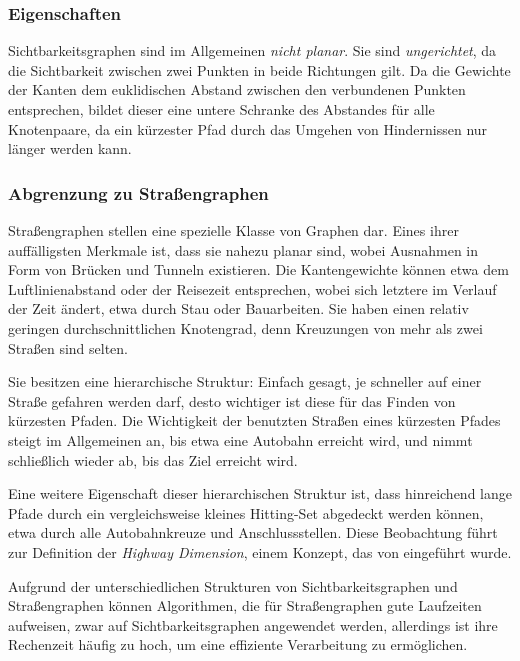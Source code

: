 \subsubsection{Eigenschaften}

Sichtbarkeitsgraphen sind im Allgemeinen \emph{nicht planar}.
Sie sind \emph{ungerichtet}, da die Sichtbarkeit zwischen zwei Punkten in beide Richtungen gilt.
Da die Gewichte der Kanten dem euklidischen Abstand zwischen den verbundenen Punkten entsprechen, bildet dieser eine untere Schranke des Abstandes für alle Knotenpaare, da ein kürzester Pfad durch das Umgehen von Hindernissen nur länger werden kann.

\subsubsection{Abgrenzung zu Straßengraphen}\label{graphs:strassengraphen}

Straßengraphen stellen eine spezielle Klasse von Graphen dar.
Eines ihrer auffälligsten Merkmale ist, dass sie nahezu planar sind, wobei Ausnahmen in Form von Brücken und Tunneln existieren.
Die Kantengewichte können etwa dem Luftlinienabstand oder der Reisezeit entsprechen, wobei sich letztere im Verlauf der Zeit ändert, etwa durch Stau oder Bauarbeiten.
Sie haben einen relativ geringen durchschnittlichen Knotengrad, denn Kreuzungen von mehr als zwei Straßen sind selten.

Sie besitzen eine hierarchische Struktur: Einfach gesagt, je schneller auf einer Straße gefahren werden darf, desto wichtiger ist diese für das Finden von kürzesten Pfaden.
Die Wichtigkeit der benutzten Straßen eines kürzesten Pfades steigt im Allgemeinen an, bis etwa eine Autobahn erreicht wird, und nimmt schließlich wieder ab, bis das Ziel erreicht wird.

Eine weitere Eigenschaft dieser hierarchischen Struktur ist, dass hinreichend lange Pfade durch ein vergleichsweise kleines Hitting-Set abgedeckt werden können, etwa durch alle Autobahnkreuze und Anschlussstellen.
Diese Beobachtung führt zur Definition der \emph{Highway Dimension}, einem Konzept, das von \cite{abraham2010highway} eingeführt wurde.

Aufgrund der unterschiedlichen Strukturen von Sichtbarkeitsgraphen und Straßengraphen können Algorithmen, die für Straßengraphen gute Laufzeiten aufweisen, zwar auf Sichtbarkeitsgraphen angewendet werden, allerdings ist ihre Rechenzeit häufig zu hoch, um eine effiziente Verarbeitung zu ermöglichen.

